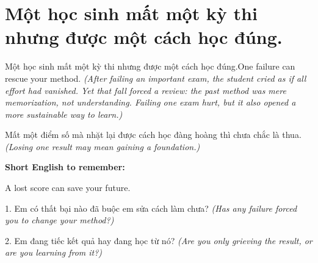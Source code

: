 \section{Một học sinh mất một kỳ thi nhưng được một cách học đúng.}
\begin{truyen}{Một học sinh mất một kỳ thi nhưng được một cách học đúng.}{One failure can rescue your method.}
\textit{(After failing an important exam, the student cried as if all effort had vanished. Yet that fall forced a review: the past method was mere memorization, not understanding. Failing one exam hurt, but it also opened a more sustainable way to learn.)}
\end{truyen}
\begin{baihoc}
Mất một điểm số mà nhặt lại được cách học đàng hoàng thì chưa chắc là thua.
\textit{(Losing one result may mean gaining a foundation.)}
\end{baihoc}
\begin{ghinhoanh}
\textbf{Short English to remember:}

A lost score can save your future.
\end{ghinhoanh}
\begin{tuhocnhanh}
1. Em có thất bại nào đã buộc em sửa cách làm chưa? \textit{(Has any failure forced you to change your method?)}

2. Em đang tiếc kết quả hay đang học từ nó? \textit{(Are you only grieving the result, or are you learning from it?)}
\end{tuhocnhanh}
\ngancach

